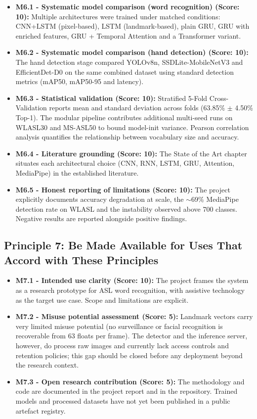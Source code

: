 \begin{itemize}
    \item \textbf{M6.1 - Systematic model comparison (word recognition) (Score: 10):} Multiple architectures were trained under matched conditions: CNN+LSTM (pixel-based), LSTM (landmark-based), plain GRU, GRU with enriched features, GRU + Temporal Attention and a Transformer variant.
    \item \textbf{M6.2 - Systematic model comparison (hand detection) (Score: 10):} The hand detection stage compared YOLOv8n, SSDLite-MobileNetV3 and EfficientDet-D0 on the same combined dataset using standard detection metrics (mAP50, mAP50-95 and latency).
    \item \textbf{M6.3 - Statistical validation (Score: 10):} Stratified 5-Fold Cross-Validation reports mean and standard deviation across folds (63.85\% $\pm$ 4.50\% Top-1). The modular pipeline contributes additional multi-seed runs on WLASL30 and MS-ASL50 to bound model-init variance. Pearson correlation analysis quantifies the relationship between vocabulary size and accuracy.
    \item \textbf{M6.4 - Literature grounding (Score: 10):} The State of the Art chapter situates each architectural choice (CNN, RNN, LSTM, GRU, Attention, MediaPipe) in the established literature.
    \item \textbf{M6.5 - Honest reporting of limitations (Score: 10):} The project explicitly documents accuracy degradation at scale, the $\sim$69\% MediaPipe detection rate on WLASL and the instability observed above 700 classes. Negative results are reported alongside positive findings.
\end{itemize}

\subsection{Principle 7: Be Made Available for Uses That Accord with These Principles}

\begin{itemize}
    \item \textbf{M7.1 - Intended use clarity (Score: 10):} The project frames the system as a research prototype for ASL word recognition, with assistive technology as the target use case. Scope and limitations are explicit.
    \item \textbf{M7.2 - Misuse potential assessment (Score: 5):} Landmark vectors carry very limited misuse potential (no surveillance or facial recognition is recoverable from 63 floats per frame). The detector and the inference server, however, do process raw images and currently lack access controls and retention policies; this gap should be closed before any deployment beyond the research context.
    \item \textbf{M7.3 - Open research contribution (Score: 5):} The methodology and code are documented in the project report and in the repository. Trained models and processed datasets have not yet been published in a public artefact registry.
\end{itemize}

